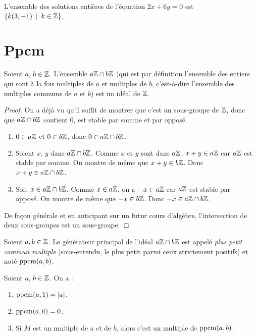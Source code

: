 \begin{exemple}
L'ensemble des solutions entières de l'équation $2x+6y=0$ est $\{k(3,-1)\:\mid\:k\in\Z\}$.
\end{exemple}



\section{Ppcm}

\begin{proposition}
Soient $a$, $b \in \mathbb{Z}$. L'ensemble $a\mathbb{Z}\cap b\mathbb{Z}$ (qui est par définition l'ensemble des entiers qui sont à la fois multiples de $a$ et multiples de $b$, c'est-à-dire l'ensemble des multiples communs de $a$ et $b$) est un idéal de $\mathbb{Z}$.
\end{proposition}
\begin{proof}
On a déjà vu qu'il suffit de montrer que c'est un sous-groupe de $\mathbb{Z}$, donc que $a\mathbb{Z}\cap b\mathbb{Z}$ contient $0$, est stable par somme et par opposé. 
\begin{enumerate}
\item $0 \in a\mathbb{Z}$ et $0\in b\mathbb{Z}$, donc $0 \in a\mathbb{Z}\cap b\mathbb{Z}$.
\item Soient $x$, $y$ dans $a\mathbb{Z}\cap b\mathbb{Z}$. Comme $x$ et $y$ sont dans $a\mathbb{Z}$, $x+y\in a\mathbb{Z}$ car $a\mathbb{Z}$ est stable par somme. On montre de même que $x+y\in b\mathbb{Z}$. Donc $x+y \in a\mathbb{Z}\cap b\mathbb{Z}$.
\item Soit $x\in a\mathbb{Z}\cap b\mathbb{Z}$. Comme $x\in a\mathbb{Z}$, on a $-x\in a\mathbb{Z}$ car $a\mathbb{Z}$ est stable par opposé. On montre de même que $-x\in b\mathbb{Z}$. Donc $-x \in a\mathbb{Z}\cap b\mathbb{Z}$.
\end{enumerate}

De façon générale et en anticipant sur un futur cours d'algèbre, l'intersection de deux sous-groupes est un sous-groupe.
\end{proof}

\begin{definition}
Soient $a, b\in \mathbb{Z}$. Le générateur principal de l'idéal $a\mathbb{Z}\cap b\mathbb{Z}$ est appelé \emph{plus petit commun multiple} (sous-entendu, le plus petit parmi ceux strictement positifs) et noté $\operatorname{ppcm}(a,b)$.
\end{definition}

\begin{proposition}
Soient $a$, $b \in \mathbb{Z}$. On a :
\begin{enumerate}
\item $\operatorname{ppcm}(a,1)=|a|$.
\item $\operatorname{ppcm}(a,0)=0$.
\item Si $M$ est un multiple de $a$ et de $b$, alors c'est un multiple de $\operatorname{ppcm}(a,b)$.
\end{enumerate}
\end{proposition}

